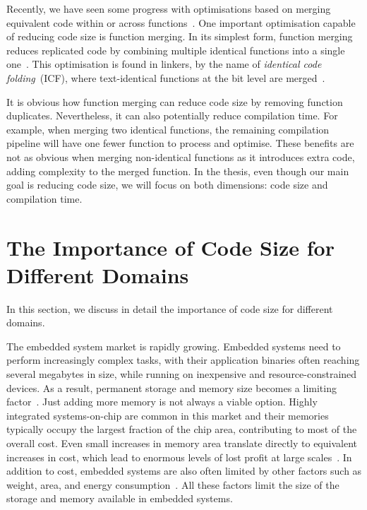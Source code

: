 Recently, we have seen some progress with optimisations based on merging equivalent code within or across functions~\cite{edler14,chabbi21}.
One important optimisation capable of reducing code size is function merging.
In its simplest form, function merging reduces replicated code by combining multiple identical functions into a single one~\cite{llvm-fm,livska14}.
This optimisation is found in linkers, by the name of \textit{identical code folding}~(ICF), where text-identical functions at the bit level are merged~\cite{tallam10,kwan12,msvc-icf}.

It is obvious how function merging can reduce code size by removing function duplicates.
Nevertheless, it can also potentially reduce compilation time.
For example, when merging two identical functions, the remaining compilation pipeline will have one fewer function to process and optimise.
These benefits are not as obvious when merging non-identical functions as it introduces extra code, adding complexity to the merged function.
In the thesis, even though our main goal is reducing code size, we will focus on both dimensions: code size and compilation time.

\section{The Importance of Code Size for Different Domains}

In this section, we discuss in detail the importance of code size for different domains.

The embedded system market is rapidly growing.
Embedded systems need to perform increasingly complex tasks, with their application binaries often reaching several megabytes in size, while running on inexpensive and resource-constrained devices.
As a result, permanent storage and memory size becomes a limiting factor~\cite{plaza18}.
Just adding more memory is not always a viable option.
Highly integrated systems-on-chip are common in this market and their memories typically occupy the largest fraction of the chip area, contributing to most of the overall cost.
Even small increases in memory area translate directly to equivalent increases in cost, which lead to enormous levels of lost profit at large scales~\cite{edler10}.
In addition to cost, embedded systems are also often limited by other factors such as weight, area, and energy consumption~\cite{tiggeler00,edwards20}.
All these factors limit the size of the storage and memory available in embedded systems. 

